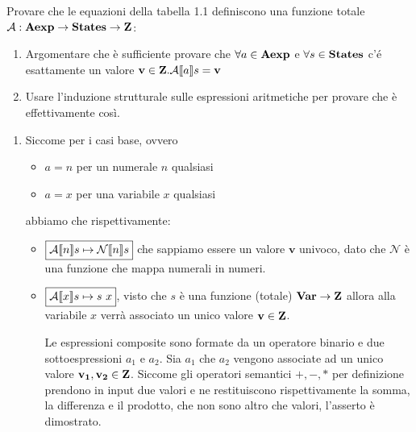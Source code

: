{Provare che le equazioni della tabella 1.1 definiscono una funzione totale 
$\mathcal{A}:\mbox{\textbf{Aexp}} \rightarrow \mbox{\textbf{States}} \rightarrow \mbox{\textbf{Z}}$: 
	\begin{enumerate}
		\item Argomentare che è sufficiente provare che  
$\forall a \in \mbox{\textbf{Aexp}}$ e $\forall s \in \mbox{\textbf{States}}$
		c'é esattamente un valore $\mathbf{v} \in \mathbf{Z}.\mathcal{A} \llbracket a \rrbracket s = 
\mathbf{v}$
		\item Usare l'induzione strutturale sulle espressioni 
aritmetiche per provare che è effettivamente così.
	\end{enumerate}
}
{
	\begin{enumerate}
		\item Siccome per i casi base, ovvero
		\begin{itemize}
			\item $\boxed{a = n}$ per un numerale $n$ qualsiasi
			\item $\boxed{a = x}$ per una variabile $x$ qualsiasi
		\end{itemize} 
		abbiamo che rispettivamente:
		\begin{itemize}
			\item $\boxed{\mathcal{A} \llbracket n \rrbracket s \mapsto \mathcal{N} \llbracket n \rrbracket s}$ che sappiamo essere un valore $\mathbf{v}$ univoco, dato che $\mathcal{N}$ è una funzione che mappa numerali in numeri.
			\item $\boxed{\mathcal{A} \llbracket x \rrbracket s \mapsto s\mbox{ } x}$, visto che $s$ è una funzione (totale) $\mbox{\textbf{Var}} \rightarrow \mbox{\textbf{Z}}$  allora
			alla variabile $x$ verrà associato un unico valore $\mathbf{v} \in \mbox{\textbf{Z}}$.
			
			Le espressioni composite sono formate da un operatore binario e due sottoespressioni
			$a_1$ e $a_2$.
			Sia $a_1$ che $a_2$ vengono associate ad un unico valore $\mathbf{v_1}, \mathbf{v_2} \in \mbox{\textbf{Z}}$.
			Siccome gli operatori semantici $+, -, *$ per definizione prendono in input due
			valori e ne restituiscono rispettivamente la somma, la differenza e il prodotto, che
			non sono altro che valori, l'asserto è dimostrato.
		

\end{itemize}
\end{enumerate}}
